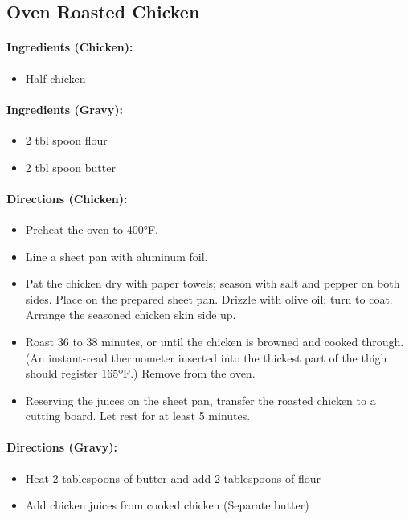 \documentclass{article}
\begin{document}
\subsection{Oven Roasted Chicken} 

\paragraph{Ingredients (Chicken):}
\begin{itemize}
    \item Half chicken
\end{itemize}  

\paragraph{Ingredients (Gravy):}
\begin{itemize}
    \item 2 tbl spoon flour
    \item 2 tbl spoon butter
\end{itemize}  

\paragraph{Directions (Chicken):}
\begin{itemize}
    \item Preheat the oven to 400°F.
    \item Line a sheet pan with aluminum foil.
    \item Pat the chicken dry with paper towels; season with salt and pepper on both sides. Place on the prepared sheet pan. Drizzle with olive oil; turn to coat. Arrange the seasoned chicken skin side up.
    \item Roast 36 to 38 minutes, or until the chicken is browned and cooked through. (An instant-read thermometer inserted into the thickest part of the thigh should register 165ºF.) Remove from the oven.
    \item Reserving the juices on the sheet pan, transfer the roasted chicken to a cutting board. Let rest for at least 5 minutes.
\end{itemize}  

\paragraph{Directions (Gravy):}
\begin{itemize}
    \item Heat 2 tablespoons of butter and add 2 tablespoons of flour
    \item Add chicken juices from cooked chicken (Separate butter)
\end{itemize} 
\end{document}
